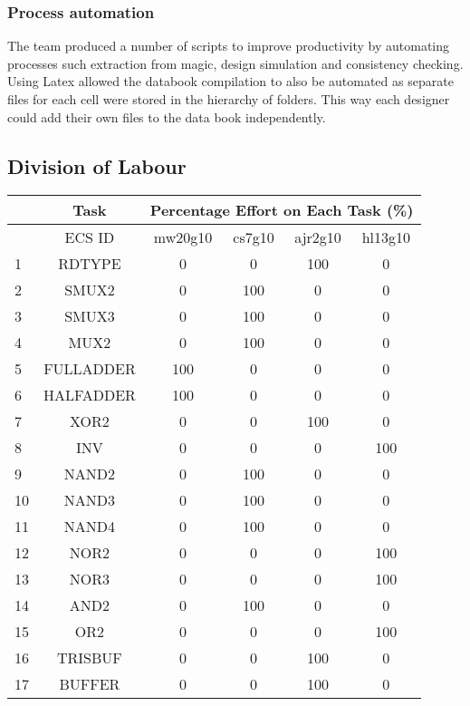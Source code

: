\subsubsection{Process automation}
The team produced a number of scripts to improve productivity by automating processes such extraction from magic, design simulation and consistency checking.
Using Latex allowed the databook compilation to also be automated as separate files for each cell were stored in the hierarchy of folders.   
This way each designer could add their own files to the data book independently.



\clearpage
\subsection{Division of Labour}
\begin{table}[htb!]
\begin{tabular}{|p{1cm}|c|c|c|c|c|}\hline
&Task & \multicolumn{4}{|c|}{Percentage Effort on Each Task (\%)} \\ \hline
& ECS ID 						& mw20g10 & cs7g10 & ajr2g10 & hl13g10 \\ \hline
1&RDTYPE						&	0	&	0	&	100	&	0	\\ \hline
2&SMUX2							&	0	&	100	&	0	&	0	\\ \hline
3&SMUX3							&	0	&	100	&	0	&	0	\\ \hline
4&MUX2							&	0	&	100	&	0	&	0	\\ \hline
5&FULLADDER					&	100	&	0	&	0	&	0	\\ \hline
6&HALFADDER					&	100	&	0	&	0	&	0	\\ \hline
7&XOR2							&	0	&	0	&	100	&	0	\\ \hline
8&INV								&	0	&	0	&	0	&	100	\\ \hline
9&NAND2							&	0	&	100	&	0	&	0	\\ \hline
10&NAND3						&	0	&	100	&	0	&	0	\\ \hline
11&NAND4						&	0	&	100	&	0	&	0	\\ \hline
12&NOR2							&	0	&	0	&	0	&	100	\\ \hline
13&NOR3							&	0	&	0	&	0	&	100	\\ \hline
14&AND2							&	0	&	100	&	0	&	0	\\ \hline
15&OR2							&	0	&	0	&	0	&	100	\\ \hline
16&TRISBUF					&	0	&	0	&	100	&	0	\\ \hline
17&BUFFER						&	0	&	0	&	100	&	0	\\ \hline

\end{tabular}
\end{table}
